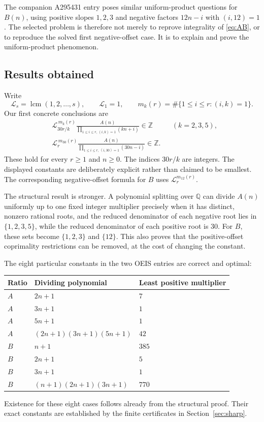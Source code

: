 \documentclass[11pt]{article}
\theoremstyle{definition}
\theoremstyle{remark}
\newcommand{\Z}{\mathbb Z}
\newcommand{\Q}{\mathbb Q}
\newcommand{\lcm}{\operatorname{lcm}}
\newcommand{\LL}{\mathcal L}
\begin{document}
The companion A295431 entry poses similar uniform-product questions for
$B(n)$, using positive slopes $1,2,3$ and negative factors $12n-i$ with
$(i,12)=1$ \cite{oeisB}. The selected problem is therefore not merely to
reprove integrality of \eqref{eq:AB}, or to reproduce the solved first
negative-offset case. It is to explain and prove the uniform-product
phenomenon.

\subsection{Results obtained}
Write
\[
 \LL_s=\lcm(1,2,\ldots,s),\qquad \LL_1=1,
 \qquad m_k(r)=\#\{1\leq i\leq r:(i,k)=1\}.
\]
Our first concrete conclusions are
\begin{align}
 &\LL_{30r/k}^{\,m_k(r)}
   \frac{A(n)}{\prod_{1\leq i\leq r,\,(i,k)=1}(kn+i)}\in\Z
   &&(k=2,3,5),\label{eq:explicitC}\\
 &\LL_r^{\,m_{30}(r)}
   \frac{A(n)}{\prod_{1\leq i\leq r,\,(i,30)=1}(30n-i)}\in\Z.
   \label{eq:explicitD}
\end{align}
These hold for every $r\geq1$ and $n\geq0$. The indices $30r/k$ are
integers. The displayed constants are deliberately explicit rather than
claimed to be smallest. The corresponding negative-offset formula for
$B$ uses $\LL_r^{m_{12}(r)}$.

The structural result is stronger. A polynomial splitting over $\Q$
can divide $A(n)$ uniformly up to one fixed integer multiplier precisely
when it has distinct, nonzero rational roots, and the reduced
denominator of each negative root lies in $\{1,2,3,5\}$, while the reduced
denominator of each positive root is $30$. For $B$, these sets become
$\{1,2,3\}$ and $\{12\}$. This also proves that the positive-offset
coprimality restrictions can be removed, at the cost of changing the
constant.

The eight particular constants in the two OEIS entries are correct and
optimal:
\begin{center}
\begin{tabular}{lll}
\toprule
Ratio & Dividing polynomial & Least positive multiplier\\
\midrule
$A$ & $2n+1$ & $7$\\
$A$ & $3n+1$ & $1$\\
$A$ & $5n+1$ & $1$\\
$A$ & $(2n+1)(3n+1)(5n+1)$ & $42$\\
$B$ & $n+1$ & $385$\\
$B$ & $2n+1$ & $5$\\
$B$ & $3n+1$ & $1$\\
$B$ & $(n+1)(2n+1)(3n+1)$ & $770$\\
\bottomrule
\end{tabular}
\end{center}
Existence for these eight cases follows already from the structural
proof. Their exact constants are established by the finite certificates
in Section~\ref{sec:sharp}.
\end{document}

